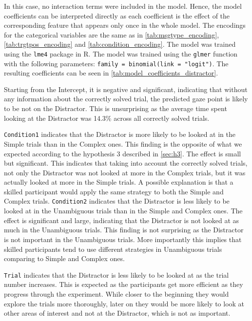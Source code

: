 In this case, no interaction terms were included in the model. Hence, the model coefficients can be interpreted directly as each coefficient is the effect of the corresponding feature that appears only once in the whole model. The encodings for the categorical variables are the same as in \autoref{tab:msgtype_encoding}, \autoref{tab:trgtpos_encoding} and \autoref{tab:condition_encoding}. The model was trained using the \texttt{lme4} package in R. The model was trained using the \texttt{glmer} function with the following parameters: \texttt{family = binomial(link = "logit")}. The resulting coefficients can be seen in \autoref{tab:model_coefficients_distractor}.

Starting from the Intercept, it is negative and significant, indicating that without any information about the correctly solved trial, the predicted gaze point is likely to be not on the Distractor. This is unsurprising as the average time spent looking at the Distractor was 14.3\% across all correctly solved trials. 

\texttt{Condition1} indicates that the Distractor is more likely to be looked at in the Simple trials than in the Complex ones. This finding is the opposite of what we expected according to the hypothesis 3 described in \autoref{sec:h3}. The effect is small but significant. This indicates that taking into account the correctly solved trials, not only the Distractor was not looked at more in the Complex trials, but it was actually looked at more in the Simple trials. A possible explanation is that a skilled participant would apply the same strategy to both the Simple and Complex trials. \texttt{Condition2} indicates that the Distractor is less likely to be looked at in the Unambiguous trials than in the Simple and Complex ones. The effect is significant and large, indicating that the Distractor is not looked at as much in the Unambiguous trials. This finding is not surprising as the Distractor is not important in the Unambiguous trials. More importantly this implies that skilled participants tend to use different strategies in Unambiguous trials comparing to Simple and Complex ones.

\texttt{Trial} indicates that the Distractor is less likely to be looked at as the trial number increases. This is expected as the participants get more efficient as they progress through the experiment. While closer to the beginning they would explore the trials more thoroughly, later on they would be more likely to look at other areas of interest and not at the Distractor, which is not as important. 

